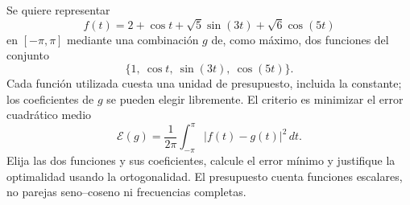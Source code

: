 Se quiere representar
\[
f(t)=2+\cos t+\sqrt5\sin(3t)+\sqrt6\cos(5t)
\]
en \([-\pi,\pi]\) mediante una combinación \(g\) de, como máximo, dos funciones del conjunto
\[
\{1,\ \cos t,\ \sin(3t),\ \cos(5t)\}.
\]
Cada función utilizada cuesta una unidad de presupuesto, incluida la constante; los coeficientes de \(g\) se pueden elegir libremente. El criterio es minimizar el error cuadrático medio
\[
\mathcal E(g)=\frac1{2\pi}\int_{-\pi}^{\pi}|f(t)-g(t)|^2\,dt.
\]
Elija las dos funciones y sus coeficientes, calcule el error mínimo y justifique la optimalidad usando la ortogonalidad. El presupuesto cuenta funciones escalares, no parejas seno--coseno ni frecuencias completas.
